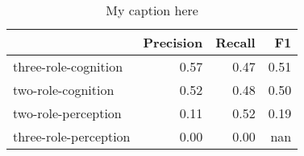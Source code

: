 \begin{table}[!ht]
\centering
\begin{tabular}{lrrr}
\toprule
{} &  Precision &  Recall &   F1 \\
\midrule
three-role-cognition  &       0.57 &    0.47 & 0.51 \\
two-role-cognition    &       0.52 &    0.48 & 0.50 \\
two-role-perception   &       0.11 &    0.52 & 0.19 \\
three-role-perception &       0.00 &    0.00 &  nan \\
\bottomrule
\end{tabular}
\caption{My caption here}
\label{tab:MENTAL-oe-combined-F1}
\end{table}